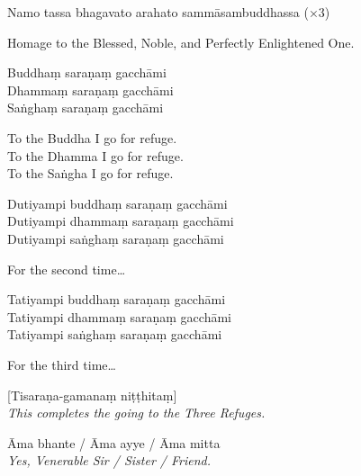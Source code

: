
Namo tassa bhagavato arahato sammāsambuddhassa (×3)
\begin{english}
  Homage to the Blessed, Noble, and Perfectly Enlightened One.
\end{english}

Buddhaṃ saraṇaṃ gacchāmi\\
Dhammaṃ saraṇaṃ gacchāmi\\
Saṅghaṃ saraṇaṃ gacchāmi

\begin{english}
  To the Buddha I go for refuge.\\
  To the Dhamma I go for refuge.\\
  To the Saṅgha I go for refuge.
\end{english}

Dutiyampi buddhaṃ saraṇaṃ gacchāmi\\
Dutiyampi dhammaṃ saraṇaṃ gacchāmi\\
Dutiyampi saṅghaṃ saraṇaṃ gacchāmi

\begin{english}
  For the second time\ldots
\end{english}

Tatiyampi buddhaṃ saraṇaṃ gacchāmi\\
Tatiyampi dhammaṃ saraṇaṃ gacchāmi\\
Tatiyampi saṅghaṃ saraṇaṃ gacchāmi

\begin{english}
  For the third time\ldots
\end{english}


[Tisaraṇa-gamanaṃ niṭṭhitaṃ]\\
\emph{This completes the going to the Three Refuges.}


Āma bhante / Āma ayye / Āma mitta\\
\emph{Yes, Venerable Sir / Sister / Friend.}

\enlargethispage{-\baselineskip}


